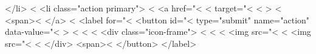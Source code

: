 {        </li>
      <%
        <li class="action primary">
          <%
            <a href="<%
              <%
                target="<%
              <%
            >
                <%
                <span><%
            </a>
          <%
            <label for="<%
                <button id="<%
                     type="submit"
                     name="action"
                     data-value="<%
                     >
                    <%
                      <%
                    <%
                    <div class="icon-frame">
                      <%
                        <%
                      <%
                        <img src="<%
                      <%
                        <img src="<%
                      <%
                    </div>
                    <span><%
                </button>
            </label>

}
